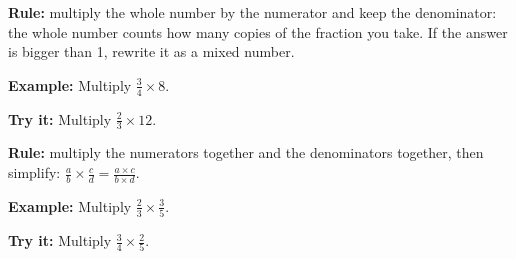 \documentclass[12pt]{article}
\begin{document}


\begin{formulabox}
\textbf{Rule:} multiply the whole number by the numerator and keep the
denominator: the whole number counts how many copies of the fraction you
take. If the answer is bigger than 1, rewrite it as a mixed number.
\end{formulabox}

\begin{examplebox}
\textbf{Example:} \quad Multiply $\tfrac{3}{4} \times 8$.
\end{examplebox}

\begin{tryitbox}
\textbf{Try it:} \quad Multiply $\tfrac{2}{3} \times 12$.\\[2pt]
\end{tryitbox}


\begin{formulabox}
\textbf{Rule:} multiply the numerators together and the denominators
together, then simplify:
$\tfrac{a}{b} \times \tfrac{c}{d} = \tfrac{a \times c}{b \times d}$.
\end{formulabox}

\begin{examplebox}
\textbf{Example:} \quad Multiply $\tfrac{2}{3} \times \tfrac{3}{5}$.
\end{examplebox}

\begin{tryitbox}
\textbf{Try it:} \quad Multiply $\tfrac{3}{4} \times \tfrac{2}{5}$.\\[2pt]
\end{tryitbox}

\end{document}
